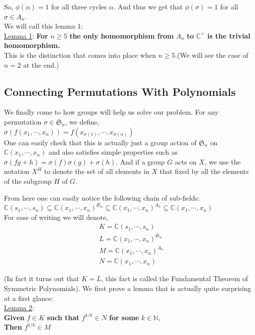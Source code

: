 \documentclass[a4paper,12pt,abstracton]{scrartcl}
\theoremstyle{dotlessP}
\theoremstyle{dotlessS}
\theoremstyle{remark}
\theoremstyle{definition}
\begin{document}
So, $\phi(\alpha)=1$ for all three cycles $\alpha$. And thus we get that $\phi(\sigma)=1$ for all $\sigma\in A_n$.\\

We will call this lemma 1:\\
\underline{Lemma 1}:
\textbf{For } $n\geq 5$ \textbf{ the only homomorphism from } $A_n$ \textbf{ to } $\mathbb{C}^{\times}$ \textbf{ is the trivial homomorphism.}\\

This is the distinction that comes into place when $n\geq 5$.(We will see the case of $n=2$ at the end.)

\subsection{Connecting Permutations With Polynomials}

We finally come to how groups will help us solve our problem. For any permutation $\sigma\in\mathfrak{S}_n$, we define,\\
$\sigma(f(x_1,\cdots,x_n))=f(x_{\sigma(1)},\cdots,x_{\sigma(n)})$\\
One can easily check that this is actually just a group action of $\mathfrak{S}_n$ on $\mathbb{C}(x_1,\cdots,x_n)$ and also satisfies simple properties such as $\sigma(fg+h)=\sigma(f)\sigma(g)+\sigma(h)$. And if a group $G$ acts on $X$, we use the notation $X^H$ to denote the set of all elements in $X$ that fixed by all the elements of the subgroup $H$ of $G$.

From here one can easily notice the following chain of sub-fields:\\

$\mathbb{C}(s_1,\cdots,s_n)\subseteq\mathbb{C}(x_1,\cdots,x_n)^{\mathfrak{S}_n}\subseteq\mathbb{C}(x_1,\cdots,x_n)^{A_n}\subseteq\mathbb{C}(x_1,\cdots,x_n)$\\

For ease of writing we will denote,
\begin{align*}
&K=\mathbb{C}(s_1,\cdots,s_n)\\
&L=\mathbb{C}(x_1,\cdots,x_n)^{\mathfrak{S}_n}\\
&M=\mathbb{C}(x_1,\cdots,x_n)^{A_n}\\
&N=\mathbb{C}(x_1,\cdots,x_n)
\end{align*}

(In fact it turns out that $K=L$, this fact is called the Fundamental Theorem of Symmetric Polynomials). We first prove a lemma that is actually quite surprising at a first glance:\\
\underline{Lemma 2}:\\
\textbf{Given } $f\in K$ \textbf{ such that } $f^{1/k}\in N$ \textbf{ for some } $k\in\mathbb{N}$,\\
\textbf{Then } $f^{1/k}\in M$
\end{document}
